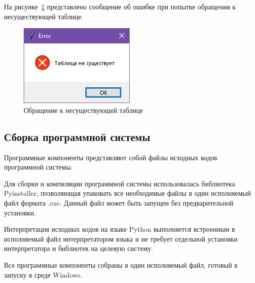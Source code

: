 На рисунке~\ref{fig:error_table} представлено сообщение об ошибке при попытке обращения к несуществующей таблице.
\begin{figure}[H]
	\centering
	\includegraphics[width=0.7\linewidth]{"images/ошибка таблица"}
	\caption{Обращение к несуществующей таблице}
	\label{fig:error_table}
\end{figure}



\subsection{Сборка программной системы}

Программные компоненты представляют собой файлы исходных кодов программной системы.

Для сборки и компиляции программной системы использовалась библиотека Pyinstaller, позволяющая упаковать все необходимые файлы в один исполняемый файл формата .exe. Данный файл может быть запущен без предварительной установки.

Интерпретация исходных кодов на языке Python выполняется встроенным в исполняемый файл интерпретатором языка и не требует отдельной установки интерпретатора и библиотек на целевую систему.

Все программные компоненты собраны в один исполняемый файл, готовый к запуску в среде Windows.